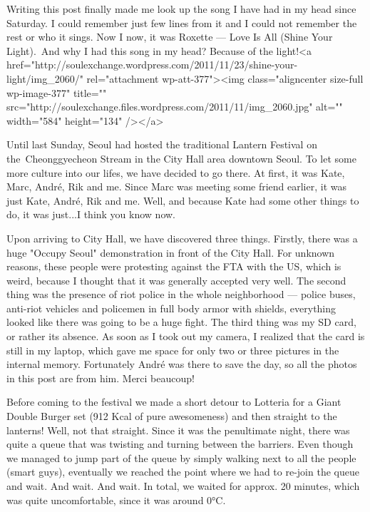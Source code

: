 \begin{post}
	\begin{content}
Writing this post finally made me look up the song I have had in my head since Saturday. I could remember just few lines from it and I could not remember the rest or who it sings. Now I now, it was Roxette — Love Is All (Shine Your Light). And why I had this song in my head? Because of the light!<a href="http://soulexchange.wordpress.com/2011/11/23/shine-your-light/img_2060/" rel="attachment wp-att-377"><img class="aligncenter size-full wp-image-377" title="" src="http://soulexchange.files.wordpress.com/2011/11/img_2060.jpg" alt="" width="584" height="134" /></a>

Until last Sunday, Seoul had hosted the traditional Lantern Festival on the Cheonggyecheon Stream in the City Hall area downtown Seoul. To let some more culture into our lifes, we have decided to go there. At first, it was Kate, Marc, André, Rik and me. Since Marc was meeting some friend earlier, it was just Kate, André, Rik and me. Well, and because Kate had some other things to do, it was just...I think you know now.

Upon arriving to City Hall, we have discovered three things. Firstly, there was a huge "Occupy Seoul" demonstration in front of the City Hall. For unknown reasons, these people were protesting against the FTA with the US, which is weird, because I thought that it was generally accepted very well. The second thing was the presence of riot police in the whole neighborhood — police buses, anti-riot vehicles and policemen in full body armor with shields, everything looked like there was going to be a huge fight. The third thing was my SD card, or rather its absence. As soon as I took out my camera, I realized that the card is still in my laptop, which gave me space for only two or three pictures in the internal memory. Fortunately André was there to save the day, so all the photos in this post are from him. Merci beaucoup!

Before coming to the festival we made a short detour to Lotteria for a Giant Double Burger set (912 Kcal of pure awesomeness) and then straight to the lanterns! Well, not that straight. Since it was the penultimate night, there was quite a queue that was twisting and turning between the barriers. Even though we managed to jump part of the queue by simply walking next to all the people (smart guys), eventually we reached the point where we had to re-join the queue and wait. And wait. And wait. In total, we waited for approx. 20 minutes, which was quite uncomfortable, since it was around 0°C.


\end{content}
\end{post}
